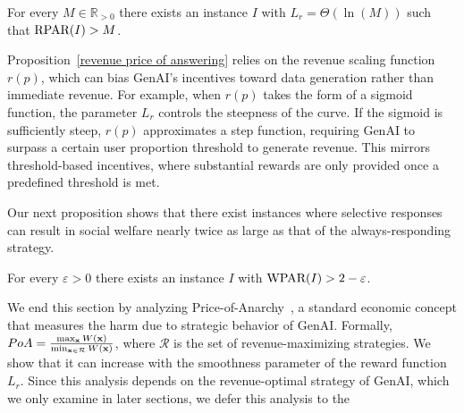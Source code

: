 \begin{proposition} \label{revenue price of answering}
For every $M \in \mathbb{R}_{>0}$ there exists an instance $I$ with $L_r = \Theta(\ln(M))$ such that $\textnormal{RPAR}(I) > M$.
\end{proposition}
Proposition~\ref{revenue price of answering} relies on the revenue scaling function $r(p)$, which can bias GenAI's incentives toward data generation rather than immediate revenue. For example, when $r(p)$ takes the form of a sigmoid function, the parameter $L_r$ controls the steepness of the curve. If the sigmoid is sufficiently steep, $r(p)$ approximates a step function, requiring GenAI to surpass a certain user proportion threshold to generate revenue. This mirrors threshold-based incentives, where substantial rewards are only provided once a predefined threshold is met.

Our next proposition shows that there exist instances where selective responses can result in social welfare nearly twice as large as that of the always-responding strategy.
\begin{proposition} \label{SW Price of answering}
For every $\varepsilon > 0$ there exists an instance $I$ with $\textnormal{WPAR}(I) > 2-\varepsilon$.
\end{proposition}
We end this section by analyzing Price-of-Anarchy~\cite{koutsoupias1999worst,roughgarden2005selfish}, a standard economic concept that measures the harm due to strategic behavior of GenAI. Formally, $PoA = \frac{\max_{{\bf{x}}} W({\bf{x}})}{\min_{{\bf{x}} \in \mathcal{R}} W({\bf{x}})}$, where $\mathcal{R}$ is the set of revenue-maximizing strategies. We show that it can increase with the smoothness parameter of the reward function $L_r$. Since this analysis depends on the revenue-optimal strategy of GenAI, which we only examine in later sections, we defer this analysis to the 

